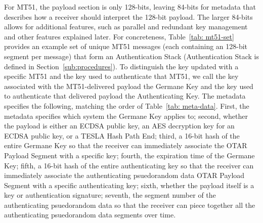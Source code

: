 \documentclass[APA,STIX1COL]{IONjournal/ION-APA Template}
\begin{document}
		For MT51, the payload section is only 128-bits, leaving 84-bits for metadata that describes how a receiver should interpret the 128-bit payload.
		The larger 84-bits allows for additional features, such as parallel and redundant key management and other features explained later.
		For concreteness, Table~\ref{tab: mt51-set} provides an example set of unique MT51 messages (each containing an 128-bit segment per message) that form an Authentication Stack (Authentication Stack is defined in Section~\ref{sub:procedures}).
		To distinguish the key updated with a specific MT51 and the key used to authenticate that MT51, we call the key associated with the MT51-delivered payload the Germane Key and the key used to authenticate that delivered payload the Authenticating Key.
		The metadata specifies the following, matching the order of Table~\ref{tab: meta-data}.
		First, the metadata specifies which system the Germane Key applies to;
		second, whether the payload is either an ECDSA public key, an AES decryption key for an ECDSA public key, or a TESLA Hash Path End;
		third, a 16-bit hash of the entire Germane Key so that the receiver can immediately associate the OTAR Payload Segment with a specific key;
		fourth, the expiration time of the Germane Key;
		fifth, a 16-bit hash of the entire authenticating key so that the receiver can immediately associate the authenticating psuedorandom data OTAR Payload Segment with a specific authenticating key;
		sixth, whether the payload itself is a key or authentication signature;
		seventh, the segment number of the authenticating psuedorandom data so that the receiver can piece together all the authenticating psuedorandom data segments over time.
\end{document}
